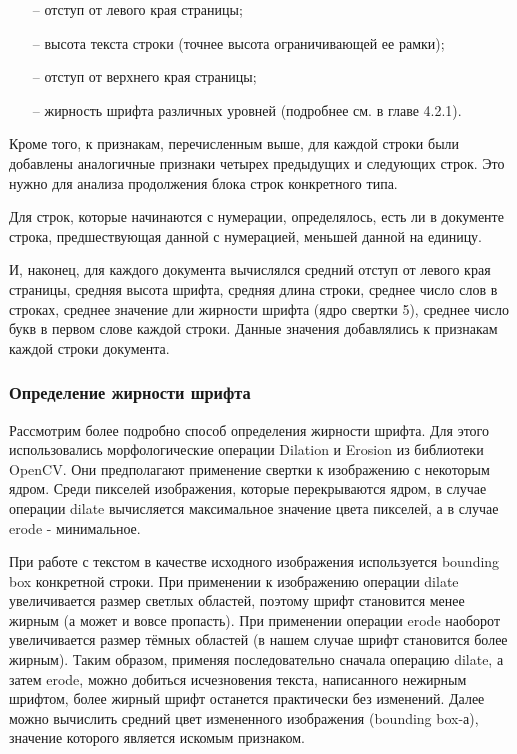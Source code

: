 \documentclass{ProcISPRAS}
\begin{document}
\begin{itemize}
  \begin{itemize}

    \item[--] отступ от левого края страницы;
    \item[--] высота текста строки (точнее высота ограничивающей ее рамки);
    \item[--] отступ от верхнего края страницы;
    \item[--] жирность шрифта различных уровней (подробнее см. в главе 4.2.1).
    
     \end{itemize}

\end{itemize}

Кроме того, к признакам, перечисленным выше, для каждой строки были добавлены аналогичные признаки четырех предыдущих и следующих строк. Это нужно для анализа продолжения блока строк конкретного типа.

Для строк, которые начинаются с нумерации, определялось, есть ли в документе строка, предшествующая данной с нумерацией, меньшей данной на единицу.

И, наконец, для каждого документа вычислялся средний отступ от левого края страницы, средняя высота шрифта, средняя длина строки, среднее число слов в строках, среднее значение дли жирности шрифта (ядро свертки 5), среднее число букв в первом слове каждой строки. Данные значения добавлялись к признакам каждой строки документа.

\subsubsection{Определение жирности шрифта}

Рассмотрим более подробно способ определения жирности шрифта. Для этого использовались морфологические операции Dilation и Erosion из библиотеки OpenCV. Они предполагают применение свертки к изображению с некоторым ядром. Среди пикселей изображения, которые перекрываются ядром, в случае операции dilate вычисляется максимальное значение цвета пикселей, а в случае erode - минимальное. 

При работе с текстом в качестве исходного изображения используется bounding box конкретной строки. При применении к изображению операции dilate увеличивается размер светлых областей, поэтому шрифт становится менее жирным (а может и вовсе пропасть). При применении операции erode наоборот увеличивается размер тёмных областей (в нашем случае шрифт становится более жирным). Таким образом, применяя последовательно сначала операцию dilate, а затем erode, можно добиться исчезновения текста, написанного нежирным шрифтом, более жирный шрифт останется практически без изменений. Далее можно вычислить средний цвет измененного изображения (bounding box-а), значение которого является искомым признаком.  
\end{document}
